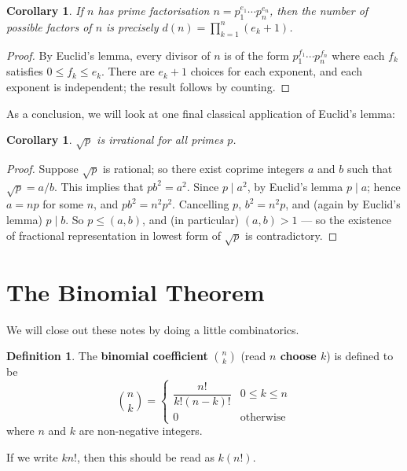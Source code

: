\documentclass[a4paper,leqno]{article}
\numberwithin{equation}{section}
\newtheorem{cor}[equation]{Corollary}
\theoremstyle{definition}
\newtheorem{defn}[equation]{Definition}
\theoremstyle{remark}
\begin{document}
\begin{cor}
  If $ n $ has prime factorisation $ n = p_1^{e_1} \cdots p_n^{e_n} $, then the number of possible factors of $ n $ is precisely $ d(n) = \prod_{k = 1}^n (e_k + 1) $.
\end{cor}
\begin{proof}
  By Euclid's lemma, every divisor of $ n $ is of the form $ p_1^{f_1} \cdots p_n^{f_n} $ where each $ f_k $ satisfies $ 0 \leq f_k \leq e_k $. There
  are $ e_k + 1 $ choices for each exponent, and each exponent is independent; the result follows by counting.
\end{proof}

As a conclusion, we will look at one final classical application of Euclid's lemma:
\begin{cor}
  $ \sqrt{p} $ is irrational for all primes $ p $.
\end{cor}
\begin{proof}
  Suppose $ \sqrt{p} $ is rational; so there exist coprime integers $ a $ and $ b $ such that $ \sqrt{p} = a/b $. This implies
  that $ pb^2 = a^2 $. Since $ p \mid a^2 $, by Euclid's lemma $ p \mid a $; hence $ a = np $ for some $ n $, and $ pb^2 = n^2 p^2 $.
  Cancelling $ p $, $ b^2 = n^2 p $, and (again by Euclid's lemma) $ p \mid b $. So $ p \leq (a,b) $, and (in particular) $ (a,b) > 1 $ ---
  so the existence of fractional representation in lowest form of $ \sqrt{p} $ is contradictory.
\end{proof}

\section{The Binomial Theorem}
We will close out these notes by doing a little combinatorics.

\begin{defn}
  The \textbf{binomial coefficient} $ \binom{n}{k} $ (read \textbf{$ n $ choose $ k $}) is defined to be
  \begin{displaymath}
    \binom{n}{k} = \begin{cases}
                     \dfrac{n!}{k!(n - k)!} & 0 \leq k \leq n\\
                     0 & \text{otherwise}
                   \end{cases}
  \end{displaymath}
  where $ n $ and $ k $ are non-negative integers.
\end{defn}

If we write $ kn! $, then this should be read as $ k(n!) $.
\end{document}

